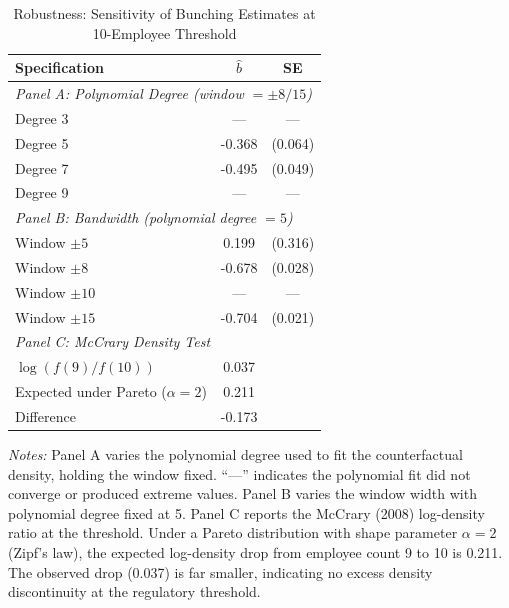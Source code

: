 \begin{table}[htbp]
\centering
\caption{Robustness: Sensitivity of Bunching Estimates at 10-Employee Threshold}
\label{tab:robustness}
\begin{threeparttable}
\begin{tabular}{lcc}
\toprule
Specification & $\hat{b}$ & SE \\
\midrule
\multicolumn{3}{l}{\textit{Panel A: Polynomial Degree (window $= \pm 8/15$)}} \\
\midrule
Degree 3 & --- & --- \\
Degree 5 & -0.368 & (0.064) \\
Degree 7 & -0.495 & (0.049) \\
Degree 9 & --- & --- \\
\midrule
\multicolumn{3}{l}{\textit{Panel B: Bandwidth (polynomial degree $= 5$)}} \\
\midrule
Window $\pm 5$ & 0.199 & (0.316) \\
Window $\pm 8$ & -0.678 & (0.028) \\
Window $\pm 10$ & --- & --- \\
Window $\pm 15$ & -0.704 & (0.021) \\
\midrule
\multicolumn{3}{l}{\textit{Panel C: McCrary Density Test}} \\
\midrule
$\log(f(9)/f(10))$ & 0.037 & \\
Expected under Pareto ($\alpha = 2$) & 0.211 & \\
Difference & -0.173 & \\
\bottomrule
\end{tabular}
\begin{tablenotes}[flushleft]
\small
\item \textit{Notes:} Panel A varies the polynomial degree used to fit the counterfactual density,
holding the window fixed. ``---'' indicates the polynomial fit did not converge or produced
extreme values. Panel B varies the window width with polynomial degree fixed at 5.
Panel C reports the McCrary (2008) log-density ratio at the threshold. Under a Pareto distribution
with shape parameter $\alpha = 2$ (Zipf's law), the expected log-density drop from employee count 9
to 10 is 0.211. The observed drop (0.037) is far smaller, indicating no excess density discontinuity
at the regulatory threshold.
\end{tablenotes}
\end{threeparttable}
\end{table}

